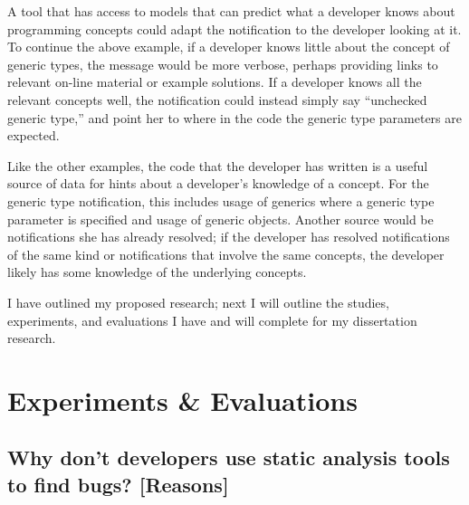 \documentclass{llncs}
\begin{document}
A tool that has access to models that can predict what a developer knows about programming concepts could adapt the notification to the developer looking at it.
To continue the above example, if a developer knows little about the concept of generic types, the message would be more verbose, perhaps providing links to 
relevant on-line material or example solutions.
If a developer knows all the relevant concepts well, the notification could instead simply say ``unchecked generic type,'' and point her to where in the code the generic type parameters are expected.

Like the other examples, the code that the developer has written is a useful source of data for hints about a developer's knowledge of a concept.
For the generic type notification, this includes usage of generics where a generic type parameter is specified and usage of generic objects.
Another source would be notifications she has already resolved; if the developer has resolved notifications of the same kind or notifications that involve the same concepts,
the developer likely has some knowledge of the underlying concepts.

I have outlined my proposed research; next I will outline the studies, experiments, and evaluations I have and will complete for my dissertation research.

\section{Experiments \& Evaluations}\label{sec:eval}
\subsection{Why don't developers use static analysis tools to find bugs? [Reasons]}\label{subsec:s1}
\end{document}
